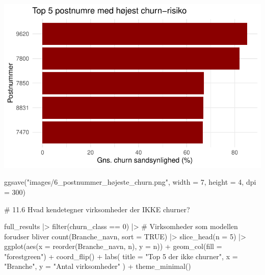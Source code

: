 \documentclass[
  11pt,
  letterpaper,
  DIV=11,
  numbers=noendperiod]{scrartcl}
\newenvironment{Shaded}{\begin{snugshade}}{\end{snugshade}}
\newcommand{\AttributeTok}[1]{\textcolor[rgb]{0.40,0.45,0.13}{#1}}
\newcommand{\CommentTok}[1]{\textcolor[rgb]{0.37,0.37,0.37}{#1}}
\newcommand{\ConstantTok}[1]{\textcolor[rgb]{0.56,0.35,0.01}{#1}}
\newcommand{\DecValTok}[1]{\textcolor[rgb]{0.68,0.00,0.00}{#1}}
\newcommand{\FunctionTok}[1]{\textcolor[rgb]{0.28,0.35,0.67}{#1}}
\newcommand{\NormalTok}[1]{\textcolor[rgb]{0.00,0.23,0.31}{#1}}
\newcommand{\SpecialCharTok}[1]{\textcolor[rgb]{0.37,0.37,0.37}{#1}}
\newcommand{\StringTok}[1]{\textcolor[rgb]{0.13,0.47,0.30}{#1}}
\begin{document}
\includegraphics{Quarto_files/figure-pdf/unnamed-chunk-16-3.pdf}

\begin{Shaded}
\begin{Highlighting}[]
\FunctionTok{ggsave}\NormalTok{(}\StringTok{"images/6\_postnummer\_højeste\_churn.png"}\NormalTok{, }\AttributeTok{width =} \DecValTok{7}\NormalTok{, }\AttributeTok{height =} \DecValTok{4}\NormalTok{, }\AttributeTok{dpi =} \DecValTok{300}\NormalTok{)}

\CommentTok{\# 11.6 Hvad kendetegner virksomheder der IKKE churner?}

\NormalTok{full\_results }\SpecialCharTok{|\textgreater{}} 
  \FunctionTok{filter}\NormalTok{(churn\_class }\SpecialCharTok{==} \DecValTok{0}\NormalTok{) }\SpecialCharTok{|\textgreater{}}  \CommentTok{\# Virksomheder som modellen forudser bliver}
  \FunctionTok{count}\NormalTok{(Branche\_navn, }\AttributeTok{sort =} \ConstantTok{TRUE}\NormalTok{) }\SpecialCharTok{|\textgreater{}} 
  \FunctionTok{slice\_head}\NormalTok{(}\AttributeTok{n =} \DecValTok{5}\NormalTok{) }\SpecialCharTok{|\textgreater{}} 
  \FunctionTok{ggplot}\NormalTok{(}\FunctionTok{aes}\NormalTok{(}\AttributeTok{x =} \FunctionTok{reorder}\NormalTok{(Branche\_navn, n), }\AttributeTok{y =}\NormalTok{ n)) }\SpecialCharTok{+}
  \FunctionTok{geom\_col}\NormalTok{(}\AttributeTok{fill =} \StringTok{"forestgreen"}\NormalTok{) }\SpecialCharTok{+}
  \FunctionTok{coord\_flip}\NormalTok{() }\SpecialCharTok{+}
  \FunctionTok{labs}\NormalTok{(}
    \AttributeTok{title =} \StringTok{"Top 5 der ikke churner"}\NormalTok{,}
    \AttributeTok{x =} \StringTok{"Branche"}\NormalTok{,}
    \AttributeTok{y =} \StringTok{"Antal virksomheder"}
\NormalTok{  ) }\SpecialCharTok{+}
  \FunctionTok{theme\_minimal}\NormalTok{()}
\end{Highlighting}
\end{Shaded}
\end{document}
